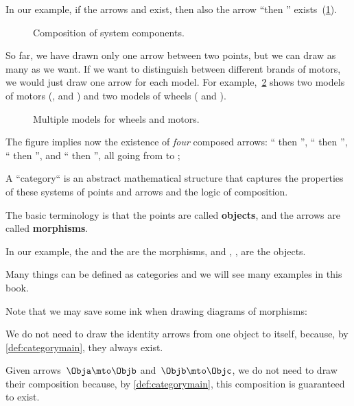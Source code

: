 In our example, if the arrows \wheels  and \motor exist, then also the arrow ``\wheels then \motor'' exists~(\cref{fig:e4}).

\begin{figure}[h!]
    \centering
    \caption{Composition of system components. }
    \label{fig:e4}
\end{figure}

So far, we have drawn only one arrow between two points, but we can draw as many as we want.
If we want to distinguish between different brands of motors, we would just draw
one arrow for each model. For example,~\cref{fig:e4bis} shows two models of
motors (, and ) and two models of wheels
( and ).


\begin{figure}[h!]
    \centering
    \caption{Multiple models for wheels and motors.}
    \label{fig:e4bis}
\end{figure}

The figure implies now the existence of \emph{four} composed
arrows: `` then '',
`` then '',
`` then '', and
`` then '', all going from \translationalmotion to \electricpower;


A ``category`` is an abstract mathematical structure that captures the properties
of these systems of points and arrows and the logic of composition.

The basic terminology is that the points are called \textbf{objects},
and the arrows are called \textbf{morphisms}.

In our example, the \motor and the \wheels are the morphisms, and \electricpower, \rotationalmotion,
\translationalmotion are the objects.

Many things can be defined as categories and we will see many examples in this book.


Note that we may save some ink when drawing diagrams of morphisms:
\begin{compactitem}
    \item We do not need to draw the identity arrows from one object to itself, because, by \cref{def:categorymain}, they always exist.
    \item  Given arrows~$\Obja \mto \Objb$ and~$\Objb \mto \Objc$, we do not need to draw their composition because, by \cref{def:categorymain}, this composition is guaranteed to exist.
\end{compactitem}

